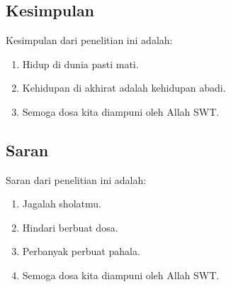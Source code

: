 %
%
%
%


\chapter{\babEnam}
\section{Kesimpulan}
Kesimpulan dari penelitian ini adalah:
\begin{enumerate}
	\item Hidup di dunia pasti mati.
	\item Kehidupan di akhirat adalah kehidupan abadi.
	\item Semoga dosa kita diampuni oleh Allah SWT.
\end{enumerate}
\section{Saran}
Saran dari penelitian ini adalah:
\begin{enumerate}
	\item Jagalah sholatmu.
	\item Hindari berbuat dosa.
	\item Perbanyak perbuat pahala.
	\item Semoga dosa kita diampuni oleh Allah SWT.
\end{enumerate}


